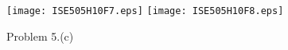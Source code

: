 \documentclass[11pt]{article}
\begin{document}
\begin{itemize}
		\begin{figure}[H]
			\centering
			\texttt{[image: ISE505H10F7.eps]}
			\texttt{[image: ISE505H10F8.eps]}
			\caption{Problem 5.(c)}
		\end{figure}
\end{itemize}
\end{document}
